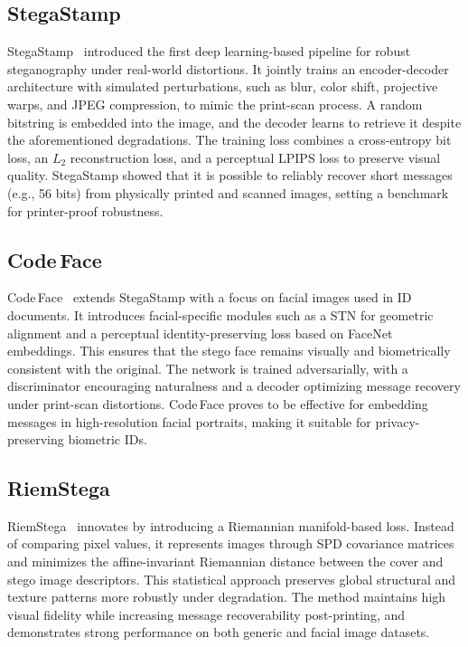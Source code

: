 \subsection{StegaStamp}
StegaStamp~\cite{tancik2020stegastamp} introduced the first deep learning-based pipeline for robust steganography under real-world distortions. It jointly trains an encoder-decoder architecture with simulated perturbations, such as blur, color shift, projective warps, and \acs{JPEG} compression, to mimic the print-scan process. A random bitstring is embedded into the image, and the decoder learns to retrieve it despite the aforementioned degradations. The training loss combines a cross-entropy bit loss, an $L_2$ reconstruction loss, and a perceptual \acs{LPIPS} loss to preserve visual quality. StegaStamp showed that it is possible to reliably recover short messages (e.g., 56 bits) from physically printed and scanned images, setting a benchmark for printer-proof robustness.

\subsection{Code\,Face}
Code\,Face~\cite{shadmand2021codeface} extends StegaStamp with a focus on facial images used in ID documents. It introduces facial-specific modules such as a \acf{STN} for geometric alignment and a perceptual identity-preserving loss based on FaceNet embeddings. This ensures that the stego face remains visually and biometrically consistent with the original. The network is trained adversarially, with a discriminator encouraging naturalness and a decoder optimizing message recovery under print-scan distortions. Code\,Face proves to be effective for embedding messages in high-resolution facial portraits, making it suitable for privacy-preserving biometric IDs.

\subsection{RiemStega}
RiemStega~\cite{cruz2025riemstega} innovates by introducing a Riemannian manifold-based loss. Instead of comparing pixel values, it represents images through \acf{SPD} covariance matrices and minimizes the affine-invariant Riemannian distance between the cover and stego image descriptors. This statistical approach preserves global structural and texture patterns more robustly under degradation. The method maintains high visual fidelity while increasing message recoverability post-printing, and demonstrates strong performance on both generic and facial image datasets.

